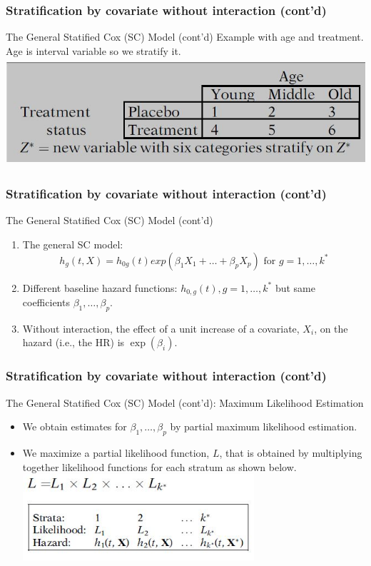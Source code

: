 \documentclass{beamer}
\theoremstyle{definition}
\begin{document}
\begin{frame}
\frametitle{Stratification by covariate without interaction (cont'd)}
\begin{block}{The General Statified Cox (SC) Model (cont'd)}
Example with age and treatment. Age is interval variable so we stratify it.
   \includegraphics[width =\textwidth, height=4cm]{CH5_exampleSC}
\end{block}
\end{frame}

\begin{frame}
\frametitle{Stratification by covariate without interaction (cont'd)}
\begin{block}{The General Statified Cox (SC) Model (cont'd)}
\begin{enumerate}
\item The general SC model:
\begin{equation} \label{SCnoint}
h_g(t,X) = h_{0g}(t)exp(\beta_1 X_1 + \ldots + \beta_p X_p) \text{ for }  g=1,\ldots,k^*
\end{equation}
\item Different baseline hazard functions: $h_{0,g}(t), g=1,\ldots,k^*$ but same coefficients $\beta_1, \ldots, \beta_p$.
\item Without interaction, the effect of a unit increase of a covariate, $X_i$, on the hazard (i.e., the HR) is $\exp(\beta_i)$.
\end{enumerate}
\end{block}
\end{frame}

\begin{frame}
\frametitle{Stratification by covariate without interaction (cont'd)}
\begin{block}{The General Statified Cox (SC) Model (cont'd): Maximum Likelihood Estimation}
\begin{itemize}
\item We obtain estimates for $\beta_1,\ldots,\beta_p$ by partial maximum likelihood estimation.
\item We maximize a partial likelihood function, $L$, that is obtained by multiplying together likelihood functions for each
stratum as shown below.
\vspace{10pt}
\includegraphics[width =\textwidth, height=3.2cm]{CH5_Partiallike}
\end{itemize}
\end{block}
\end{frame}
\end{document}
